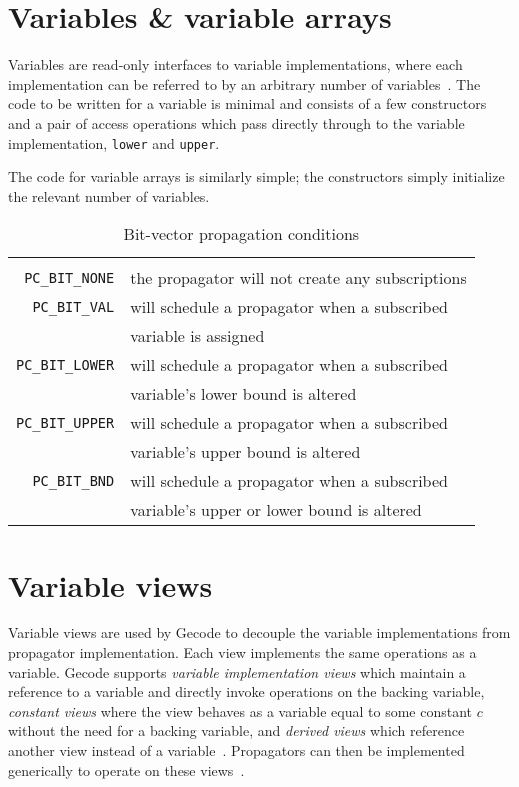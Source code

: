\documentclass[a4paper,10pt,twoside,openright]{book}
\newcommand{\bh}[1]{\text{\fontfamily{\sfdefault}\selectfont\textbf{#1}}}
\newcommand*\cd[1]{\texttt{#1}}
\begin{document}
\section{Variables \& variable arrays}
Variables are read-only interfaces to variable implementations, where each implementation can be referred to by an arbitrary number of variables~\cite{MPG:V}. The code to be written for a variable is minimal and consists of a few constructors and a pair of access operations which pass directly through to the variable implementation, \cd{lower} and \cd{upper}. 

The code for variable arrays is similarly simple; the constructors simply initialize the relevant number of variables.

\begin{table}[t]
    \small
    \begin{tabularx}{\linewidth}{ r X }
        \bh{propagation condition} & \bh{description} \\
        \cd{PC_BIT_NONE}	&	the propagator will not create any subscriptions\\
        \cd{PC_BIT_VAL}	&	will schedule a propagator when a subscribed \\
                        &   variable is assigned\\
        \cd{PC_BIT_LOWER}	&	will schedule a propagator when a subscribed \\ 
                            &   variable's lower bound is altered\\
        \cd{PC_BIT_UPPER}	&	will schedule a propagator when a subscribed \\
                            &   variable's upper bound is altered\\
        \cd{PC_BIT_BND}	&	will schedule a propagator when a subscribed \\
                        &   variable's upper or lower bound is altered\\
    \end{tabularx}
    \caption{Bit-vector propagation conditions}
    \label{tab:pc}
\end{table}
\section{Variable views}
Variable views are used by Gecode to decouple the variable implementations from propagator implementation.
Each view implements the same operations as a variable.
Gecode supports \textit{variable implementation views} which 
maintain a reference to a variable and directly invoke operations on the backing variable,
\textit{constant views} where the view behaves as a variable equal to some constant $c$ without the need for a backing variable,
and 
\textit{derived views} which reference another view instead of a variable~\cite{MPG:P}.
Propagators can then be implemented generically to operate on these views~\cite{views}.
\end{document}
